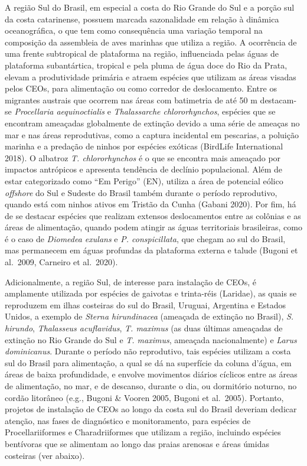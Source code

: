 \documentclass[
  oneside]{scrbook}
\begin{document}
A região Sul do Brasil, em especial a costa do Rio Grande do Sul e a porção sul da costa catarinense, possuem marcada sazonalidade em relação à dinâmica oceanográfica, o que tem como consequência uma variação temporal na composição da assembleia de aves marinhas que utiliza a região. A ocorrência de uma frente subtropical de plataforma na região, influenciada pelas águas de plataforma subantártica, tropical e pela pluma de água doce do Rio da Prata, elevam a produtividade primária e atraem espécies que utilizam as áreas visadas pelos CEOs, para alimentação ou como corredor de deslocamento. Entre os migrantes austrais que ocorrem nas áreas com batimetria de até 50 m destacam-se \emph{Procellaria aequinoctialis} e \emph{Thalassarche chlororhynchos}, espécies que se encontram ameaçadas globalmente de extinção devido a uma série de ameaças no mar e nas áreas reprodutivas, como a captura incidental em pescarias, a poluição marinha e a predação de ninhos por espécies exóticas (BirdLife International 2018). O albatroz \emph{T. chlororhynchos} é o que se encontra mais ameaçado por impactos antrópicos e apresenta tendência de declínio populacional. Além de estar categorizado como ``Em Perigo'' (EN), utiliza a área de potencial eólico \emph{offshore} do Sul e Sudeste do Brasil também durante o período reprodutivo, quando está com ninhos ativos em Tristão da Cunha (Gabani 2020). Por fim, há de se destacar espécies que realizam extensos deslocamentos entre as colônias e as áreas de alimentação, quando podem atingir as águas territoriais brasileiras, como é o caso de \emph{Diomedea exulans} e \emph{P. conspicillata}, que chegam ao sul do Brasil, mas permanecem em águas profundas da plataforma externa e talude (Bugoni et al.~2009, Carneiro et al.~2020).

Adicionalmente, a região Sul, de interesse para instalação de CEOs, é amplamente utilizada por espécies de gaivotas e trinta-réis (Laridae), as quais se reproduzem em ilhas costeiras do sul do Brasil, Uruguai, Argentina e Estados Unidos, a exemplo de \emph{Sterna hirundinacea} (ameaçada de extinção no Brasil), \emph{S. hirundo}, \emph{Thalasseus acuflavidus}, \emph{T. maximus} (as duas últimas ameaçadas de extinção no Rio Grande do Sul e \emph{T. maximus}, ameaçada nacionalmente) e \emph{Larus dominicanus}. Durante o período não reprodutivo, tais espécies utilizam a costa sul do Brasil para alimentação, a qual se dá na superfície da coluna d'água, em áreas de baixa profundidade, e envolve movimentos diários cíclicos entre as áreas de alimentação, no mar, e de descanso, durante o dia, ou dormitório noturno, no cordão litorâneo (e.g., Bugoni \& Vooren 2005, Bugoni et al.~2005). Portanto, projetos de instalação de CEOs ao longo da costa sul do Brasil deveriam dedicar atenção, nas fases de diagnóstico e monitoramento, para espécies de Procellariiformes e Charadriiformes que utilizam a região, incluindo espécies bentívoras que se alimentam ao longo das praias arenosas e áreas úmidas costeiras (ver abaixo).
\end{document}
